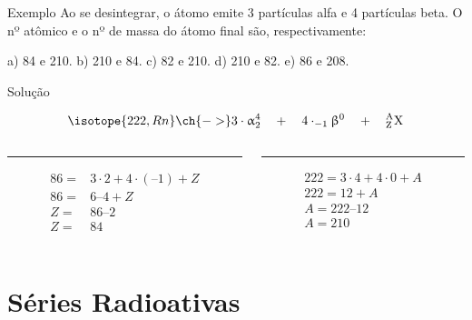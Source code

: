 \documentclass[presentation,professionalfonts,aspectratio=169]{beamer}
\begin{document}
\begin{frame}[label={sec:org4e3acc6}]{}
\vspace{-1cm}
\begin{question}{Exemplo}
\small
Ao se desintegrar, o átomo  emite 3 partículas alfa e 4 partículas beta. O nº atômico e o nº de massa do átomo final são, respectivamente:

a) 84 e 210. \qquad     b) 210 e 84.  \qquad    c) 82 e 210. \qquad    d) 210 e 82. \qquad    e) 86 e 208.

\begin{myrule}{Solução}


\begin{align*}
\isotope{222,Rn} \ch{->} 3 \cdot  \upalpha_2^4 \quad  +  \quad 4 \cdot_{-1}\upbeta^0 \quad + \quad  \rm{}_Z^AX
\end{align*}

\begin{columns}[T] %
\begin{column}{.48\textwidth}
\color{red}\rule{\linewidth}{4pt}

\begin{align*}
	86 = & 3 \cdot 2 + 4 \cdot (– 1) + Z \\
	86 = & 6 – 4 + Z \\
	Z = & 86 – 2 \\
	Z = & 84
\end{align*}

\end{column}%
\hfill%
\begin{column}{.48\textwidth}
\color{blue}\rule{\linewidth}{4pt}

\begin{align*}
222 = 3 \cdot 4 + 4\cdot 0 + A \\
222 = 12 + A \\
A = 222 – 12 \\ 
A = 210 \\ 
\end{align*}
\end{column}%
\end{columns}
\end{myrule}
\end{question}
\end{frame}





\section{Séries Radioativas}
\label{sec:org0c4351a}
\end{document}

